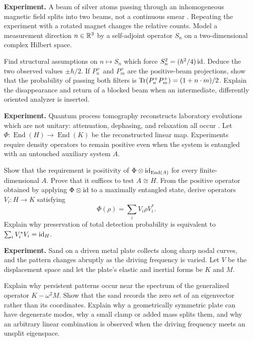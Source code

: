 \begin{exercise}
\textbf{Experiment.}
A beam of silver atoms passing through an inhomogeneous magnetic field splits
into two beams, not a continuous smear \cite{stern-gerlach}.  Repeating the
experiment with a rotated magnet changes the relative counts.  Model a
measurement direction \(n\in\mathbb R^3\) by a self-adjoint operator \(S_n\) on a
two-dimensional complex Hilbert space.

Find structural assumptions on \(n\mapsto S_n\) which force
\(S_n^2=(\hbar^2/4)\operatorname{id}\).  Deduce the two observed values
\(\pm\hbar/2\).  If \(P_n^+\) and \(P_m^+\) are the positive-beam projections,
show that the probability of passing both filters is
\(\operatorname{Tr}(P_n^+P_m^+)=(1+n\cdot m)/2\).  Explain the disappearance and return of a
blocked beam when an intermediate, differently oriented analyzer is inserted.
\end{exercise}

\begin{exercise}
\textbf{Experiment.}
Quantum process tomography reconstructs laboratory evolutions which are not
unitary: attenuation, dephasing, and relaxation all occur
\cite{altepeter}.  Let \(\Phi:\operatorname{End}(H)\to\operatorname{End}(K)\)
be the reconstructed linear map.  Experiments require density operators to
remain positive even when the system is entangled with an untouched auxiliary
system \(A\).

Show that the requirement is positivity of
\(\Phi\otimes\operatorname{id}_{\operatorname{End}(A)}\) for every finite-dimensional
\(A\).  Prove that it suffices to test \(A\cong H\).  From the positive
operator obtained by applying \(\Phi\otimes\operatorname{id}\) to a maximally entangled
state, derive operators \(V_i:H\to K\) satisfying
\[
        \Phi(\rho)=\sum_i V_i\rho V_i^*.
\]
Explain why preservation of total detection probability is equivalent to
\(\sum_iV_i^*V_i=\operatorname{id}_H\).
\end{exercise}

\begin{exercise}
\textbf{Experiment.}
Sand on a driven metal plate collects along sharp nodal curves, and the
pattern changes abruptly as the driving frequency is varied.
Let \(V\) be the displacement space and let the plate's elastic and inertial
forms be \(K\) and \(M\).

Explain why persistent patterns occur near the spectrum of the generalized
operator \(K-\omega^2M\).  Show that the sand records the zero set of an
eigenvector rather than its coordinates.  Explain why a geometrically
symmetric plate can have degenerate modes, why a small clamp or added mass
splits them, and why an arbitrary linear combination is observed when the
driving frequency meets an unsplit eigenspace.
\end{exercise}

